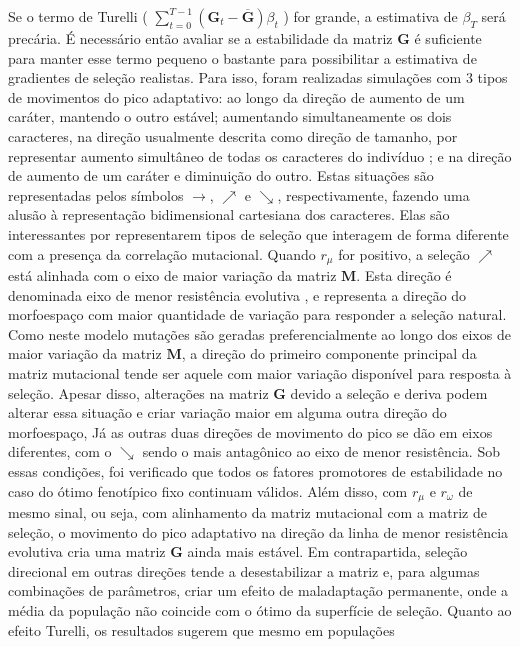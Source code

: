 Se o termo de Turelli ( $\sum_{t=0}^{T-1} (\mathbf{G}_t - \overline {\mathbf{G}})
\beta_t$ ) for grande, a estimativa de $\beta_T$ será precária.
É necessário então avaliar se a estabilidade da matriz $\mathbf{G}$ é suficiente
para manter esse termo pequeno o bastante para possibilitar a
estimativa de gradientes de seleção realistas.
Para isso, foram realizadas simulações com 3 tipos de movimentos do pico
adaptativo: ao longo da direção de aumento de um caráter, mantendo o outro
estável; aumentando simultaneamente os dois caracteres, na direção usualmente
descrita como direção de tamanho, por representar aumento simultâneo de
todas os caracteres do indivíduo \citep{Marroig2005}; e na direção de
aumento de um caráter e diminuição do outro.
Estas situações são representadas pelos símbolos $\rightarrow$,
$\nearrow$ e $\searrow$, respectivamente, fazendo uma alusão à
representação bidimensional cartesiana dos caracteres.
Elas são interessantes por representarem tipos de seleção que interagem
de forma diferente com a presença da correlação mutacional.
Quando $r_\mu$ for positivo, a seleção $\nearrow$ está alinhada com o
eixo de maior variação da matriz $\mathbf{M}$.
Esta direção é denominada eixo de menor resistência evolutiva
\citep{Schluter1996}, e  representa a direção do morfoespaço com maior
quantidade de variação para responder a seleção natural.
Como neste modelo mutações são geradas preferencialmente ao longo dos eixos de maior
variação da matriz $\mathbf{M}$, a direção do primeiro componente
principal da matriz mutacional tende ser aquele com maior variação
disponível para resposta à seleção.
Apesar disso, alterações na matriz $\mathbf{G}$ devido a seleção e
deriva podem alterar essa situação e criar variação maior em alguma
outra direção do morfoespaço, 
Já as outras duas direções de movimento do pico se dão em eixos
diferentes, com o $\searrow$ sendo o mais antagônico ao eixo de menor
resistência.
Sob essas condições, foi verificado que todos os fatores promotores de
estabilidade no caso do ótimo fenotípico fixo continuam válidos.
Além disso, com $r_\mu$ e $r_\omega$ de mesmo sinal, ou seja, com
alinhamento da matriz mutacional com a matriz de seleção, o movimento
do pico adaptativo na direção da linha de menor resistência evolutiva
cria uma matriz $\mathbf{G}$ ainda mais estável.
Em contrapartida, seleção direcional em outras direções tende a
desestabilizar a matriz e, para algumas combinações de parâmetros, criar
um efeito de maladaptação permanente, onde a média da população não
coincide com o ótimo da superfície de seleção.
Quanto ao efeito Turelli, os resultados sugerem que mesmo em populações
